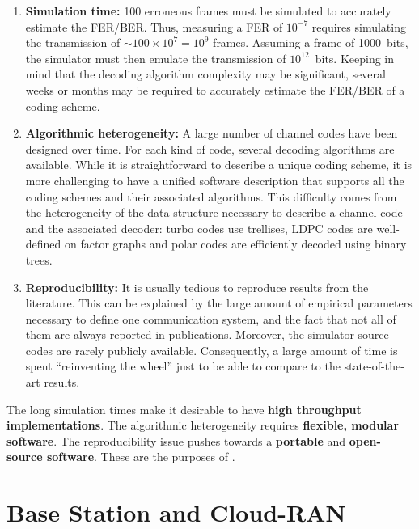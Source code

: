 \begin{enumerate}
  \item \textbf{Simulation time:}
    100 erroneous frames must be simulated to accurately estimate the FER/BER.
    Thus, measuring a FER of $10^{-7}$ requires simulating the transmission of
    $\sim100\times 10^7=10^9$ frames. Assuming a frame of 1000~bits, the
    simulator must then emulate the transmission of $10^{12}$~bits. Keeping in
    mind that the decoding algorithm complexity may be significant, several
    weeks or months may be required to accurately estimate the FER/BER of a
    coding scheme.

  \item \textbf{Algorithmic heterogeneity:} A large number of channel codes have
    been designed over time. For each kind of code, several decoding algorithms
    are available. While it is straightforward to describe a unique coding
    scheme, it is more challenging to have a unified software description that
    supports all the coding schemes and their associated algorithms. This
    difficulty comes from the heterogeneity of the data structure necessary to
    describe a channel code and the associated decoder: turbo codes use
    trellises, LDPC codes are well-defined on factor graphs and polar codes are
    efficiently decoded using binary trees.

  \item \textbf{Reproducibility:} It is usually tedious to reproduce results
    from the literature. This can be explained by the large amount of empirical
    parameters necessary to define one communication system, and the fact that
    not all of them are always reported in publications. Moreover, the simulator
    source codes are rarely publicly available. Consequently, a large amount of
    time is spent ``reinventing the wheel'' just to be able to compare to the
    state-of-the-art results.
\end{enumerate}

The long simulation times make it desirable to have \textbf{high throughput
implementations}. The algorithmic heterogeneity requires \textbf{flexible,
modular software}. The reproducibility issue pushes towards a \textbf{portable}
and \textbf{open-source software}. These are the purposes of \AFFECT.

\section{Base Station and Cloud-RAN}

